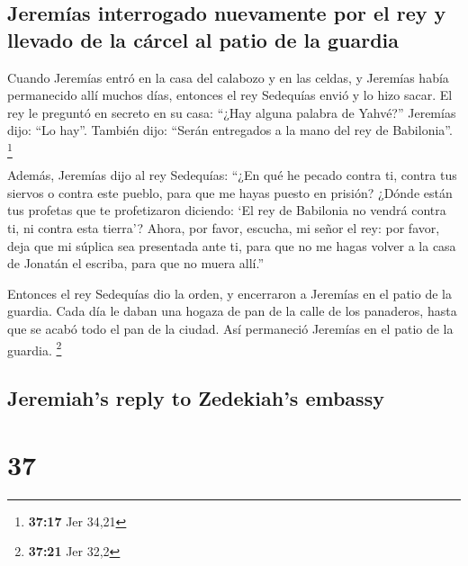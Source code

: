 \begin{paracol}{2}
{\subsection{Jeremías interrogado nuevamente por el rey y llevado de la
cárcel al patio de la
guardia}\label{jeremuxedas-interrogado-nuevamente-por-el-rey-y-llevado-de-la-cuxe1rcel-al-patio-de-la-guardia}}

 Cuando Jeremías entró en la casa del calabozo y en las
celdas, y Jeremías había permanecido allí muchos días, 
entonces el rey Sedequías envió y lo hizo sacar. El rey le preguntó en
secreto en su casa: ``¿Hay alguna palabra de Yahvé?'' Jeremías dijo:
``Lo hay''. También dijo: ``Serán entregados a la mano del rey de
Babilonia''. \footnote{\textbf{37:17} Jer 34,21}

 Además, Jeremías dijo al rey Sedequías: ``¿En qué he
pecado contra ti, contra tus siervos o contra este pueblo, para que me
hayas puesto en prisión?  ¿Dónde están tus profetas que
te profetizaron diciendo: `El rey de Babilonia no vendrá contra ti, ni
contra esta tierra'?  Ahora, por favor, escucha, mi señor
el rey: por favor, deja que mi súplica sea presentada ante ti, para que
no me hagas volver a la casa de Jonatán el escriba, para que no muera
allí.''

 Entonces el rey Sedequías dio la orden, y encerraron a
Jeremías en el patio de la guardia. Cada día le daban una hogaza de pan
de la calle de los panaderos, hasta que se acabó todo el pan de la
ciudad. Así permaneció Jeremías en el patio de la guardia. \footnote{\textbf{37:21}
  Jer 32,2}

\switchcolumn
\begin{otherlanguage}{english}

\hypertarget{jeremiahs-reply-to-zedekiahs-embassy}{%
\subsection{Jeremiah's reply to Zedekiah's
embassy}\label{jeremiahs-reply-to-zedekiahs-embassy}}

\hypertarget{section-73}{%
\section{37}\label{section-73}}


\end{otherlanguage}
\end{paracol}
